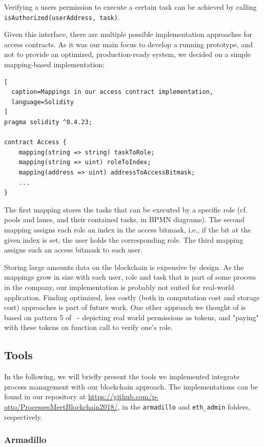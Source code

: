 \documentclass[runningheads]{llncs}
\begin{document}
Verifying a users permission to execute a certain task can be achieved by calling \texttt{isAuthorized(userAddress, task)}.
\newline

Given this interface, there are multiple possible implementation approaches for access contracts.
As it was our main focus to develop a running prototype, and not to provide an optimized, production-ready system, we decided on a simple mapping-based implementation:
\begin{lstlisting}[
  caption=Mappings in our access contract implementation,
  language=Solidity
]
pragma solidity ^0.4.23;

contract Access {
    mapping(string => string) taskToRole;
    mapping(string => uint) roleToIndex;
    mapping(address => uint) addressToAccessBitmask;
    ...
}
\end{lstlisting}
The first mapping stores the tasks that can be executed by a specific role (cf. pools and lanes, and their contained tasks, in BPMN diagrams).
The second mapping assigns each role an index in the access bitmask, i.e., if the bit at the given index is set, the user holds the corresponding role.
The third mapping assigns such an access bitmask to each user.

Storing large amounts data on the blockchain is expensive by design.
As the mappings grow in size with each user, role and task that is part of some process in the company, our implementation is probably not suited for real-world application.
Finding optimized, less costly (both in computation cost and storage cost) approaches is part of future work.
One other approach we thought of is based on pattern 5 of~\cite{xu2018pattern} - depicting real world permissions as tokens, and "paying" with these tokens on function call to verify one's role.

\subsection{Tools}

In the following, we will briefly present the tools we implemented integrate process management with our blockchain approach.
The implementations can be found in our repository at \url{https://github.com/p-otto/ProcessesMeetBlockchain2018/}, in the \texttt{armadillo} and \texttt{eth\_admin} folders, respectively.

\subsubsection{Armadillo}
\end{document}
